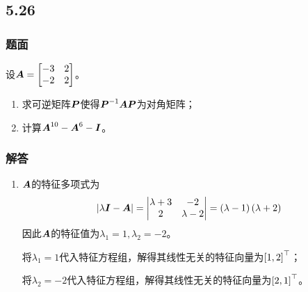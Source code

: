 \documentclass{beamer}
\begin{document}
\subsection*{5.26}
\begin{frame}
    \frametitle{题面}
    设\(\boldsymbol{A}=\begin{bmatrix}-3&2\\-2&2\end{bmatrix}\)。
    \begin{enumerate}
        \item 求可逆矩阵\(\boldsymbol{P}\)使得\({\boldsymbol{P}}^{-1}\boldsymbol{A}\boldsymbol{P}\)为对角矩阵；
        \item 计算\(\boldsymbol{A}^{10}-\boldsymbol{A}^6-\boldsymbol{I}\)。
    \end{enumerate}
\end{frame}

\begin{frame}[allowframebreaks]
    \frametitle{解答}
    \begin{enumerate}
        \item {
              \(\boldsymbol{A}\)的特征多项式为
              \begin{equation*}
                  \left|\lambda\boldsymbol{I}-\boldsymbol{A} \right|=\begin{vmatrix}\lambda+3&-2\\2&\lambda-2\end{vmatrix}=\left( \lambda-1 \right)\left( \lambda+2 \right)
              \end{equation*}
              因此\(\boldsymbol{A}\)的特征值为\(\lambda_1=1,\lambda_2=-2\)。

              将\(\lambda_1=1\)代入特征方程组，解得其线性无关的特征向量为\(\left[ 1,2 \right]^\top\)；

              将\(\lambda_2=-2\)代入特征方程组，解得其线性无关的特征向量为\(\left[ 2,1 \right]^\top\)。

}
\end{enumerate}
\end{frame}
\end{document}
